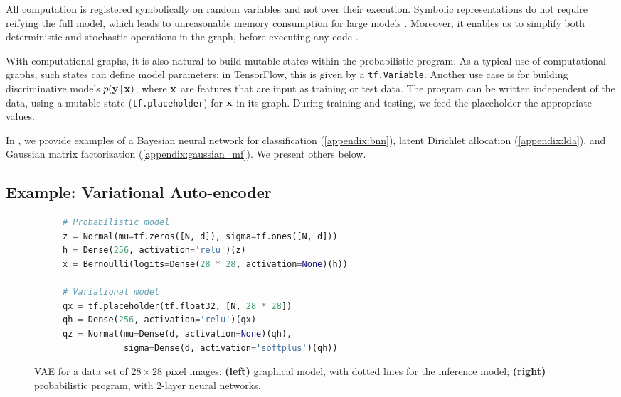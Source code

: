 All computation is registered symbolically on random variables and not
over their execution. Symbolic representations
do not require reifying the full model, which leads to unreasonable
memory consumption for large models \citep{tristan2014augur}.
Moreover, it enables us to simplify both deterministic and stochastic
operations in the graph, before executing any code
\citep{scibior2015practical,zinkov2016composing}.

With computational graphs, it is also natural to build mutable states
within the probabilistic program. As a typical use of computational
graphs, such states can define model parameters; in TensorFlow, this
is given by a \texttt{tf.Variable}. Another use case is for building
discriminative models $p(\boldsymbol{\mathbf{y}}\,|\,\boldsymbol{\mathbf{x}})$, where $\boldsymbol{\mathbf{x}}$ are features that
are input as training or test data. The program can be written
independent of the data, using a mutable state
(\texttt{tf.placeholder}) for $\boldsymbol{\mathbf{x}}$ in its graph. During training
and testing, we feed the placeholder the appropriate values.

In , we provide examples of a Bayesian neural
network for classification (\ref{appendix:bnn}), latent Dirichlet
allocation (\ref{appendix:lda}), and Gaussian matrix factorization
(\ref{appendix:gaussian_mf}). We present others below.

\subsection{Example: Variational Auto-encoder}
\label{sub:vae}

\begin{figure}[tb]
\begin{subfigure}{0.225\columnwidth}
  \centering
  
  \label{sub:vae_math}
\end{subfigure}%
\begin{subfigure}{0.65\columnwidth}
  \centering
\begin{lstlisting}[language=python]
# Probabilistic model
z = Normal(mu=tf.zeros([N, d]), sigma=tf.ones([N, d]))
h = Dense(256, activation='relu')(z)
x = Bernoulli(logits=Dense(28 * 28, activation=None)(h))

# Variational model
qx = tf.placeholder(tf.float32, [N, 28 * 28])
qh = Dense(256, activation='relu')(qx)
qz = Normal(mu=Dense(d, activation=None)(qh),
            sigma=Dense(d, activation='softplus')(qh))
\end{lstlisting}
  \label{sub:vae_code}
\end{subfigure}
\caption{\Acrlong{VAE} for a data set of $28\times 28$ pixel images:
\textbf{(left)} graphical model, with dotted lines for the inference
model; \textbf{(right)} probabilistic program,
with 2-layer neural networks.
}
\label{fig:vae}
\end{figure}


